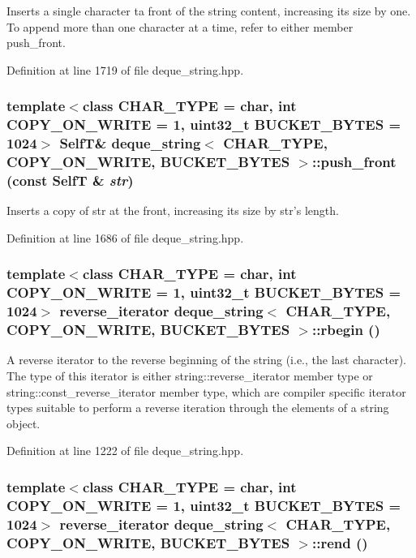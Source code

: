 Inserts a single character ta front of the string content, increasing its size by one. To append more than one character at a time, refer to either member push\_\-front. 

Definition at line 1719 of file deque\_\-string.hpp.\hypertarget{classdeque__string_466e757d7ca5a6f9680f00b56eb3cd22}{
\subsubsection[{push\_\-front}]{\setlength{\rightskip}{0pt plus 5cm}template$<$class CHAR\_\-TYPE  = char, int COPY\_\-ON\_\-WRITE = 1, uint32\_\-t BUCKET\_\-BYTES = 1024$>$ {\bf SelfT}\& {\bf deque\_\-string}$<$ CHAR\_\-TYPE, COPY\_\-ON\_\-WRITE, BUCKET\_\-BYTES $>$::push\_\-front (const {\bf SelfT} \& {\em str})}}
\label{classdeque__string_466e757d7ca5a6f9680f00b56eb3cd22}


Inserts a copy of str at the front, increasing its size by str's length. 

Definition at line 1686 of file deque\_\-string.hpp.\hypertarget{classdeque__string_372ecdc953661796143d9c7cb4dde563}{
\subsubsection[{rbegin}]{\setlength{\rightskip}{0pt plus 5cm}template$<$class CHAR\_\-TYPE  = char, int COPY\_\-ON\_\-WRITE = 1, uint32\_\-t BUCKET\_\-BYTES = 1024$>$ reverse\_\-iterator {\bf deque\_\-string}$<$ CHAR\_\-TYPE, COPY\_\-ON\_\-WRITE, BUCKET\_\-BYTES $>$::rbegin ()}}
\label{classdeque__string_372ecdc953661796143d9c7cb4dde563}


A reverse iterator to the reverse beginning of the string (i.e., the last character). The type of this iterator is either string::reverse\_\-iterator member type or string::const\_\-reverse\_\-iterator member type, which are compiler specific iterator types suitable to perform a reverse iteration through the elements of a string object. 

Definition at line 1222 of file deque\_\-string.hpp.\hypertarget{classdeque__string_6816bb979aae4999ef6076889047be04}{
\subsubsection[{rend}]{\setlength{\rightskip}{0pt plus 5cm}template$<$class CHAR\_\-TYPE  = char, int COPY\_\-ON\_\-WRITE = 1, uint32\_\-t BUCKET\_\-BYTES = 1024$>$ reverse\_\-iterator {\bf deque\_\-string}$<$ CHAR\_\-TYPE, COPY\_\-ON\_\-WRITE, BUCKET\_\-BYTES $>$::rend ()}}
\label{classdeque__string_6816bb979aae4999ef6076889047be04}


